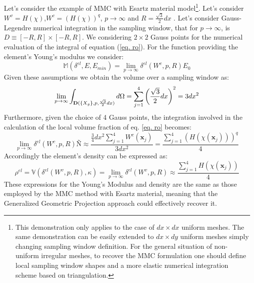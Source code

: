  Let's consider the example of MMC with Esartz material model\footnote{This demonstration only applies to the case of $dx \times dx$ uniform meshes. The same demonstration can be easily extended to $dx \times dy$ uniform meshes simply changing sampling window definition. For the general situation of non-uniform irregular meshes, to recover the MMC formulation one should define local sampling window shapes and a more elastic numerical integration scheme based on triangulation.}.
 Let's consider $W^v=H(\chi)$,$W^c=(H(\chi))^q$, $p\to\infty$ and $R=\frac{\sqrt{3}}{2}dx$ . Let's consider Gauss-Legendre numerical integration in the sampling window, that for $p\to \infty$, is $D \equiv [-R,R]\times [-R,R]$.  We considering  $2 \times 2$ Gauss points for the numerical evaluation of the integral of equation (\ref{eq. ro}). For the function providing the element's Young's modulus we consider:
 \begin{equation}
   \mathbb{M}(\delta^{el},E,E_{min})=\lim_{p\to \infty}\delta^{el}(W^c,p,R)E_0 
 \end{equation}
 Given these assumptions we obtain the volume over a sampling window as: 
 \begin{equation}
    \lim_{p\to \infty} \int_{\mathbf{D}(\left\{{X_g}\right\},p,\frac{\sqrt{3}}{2}dx)}{d\Omega}=\sum_{j=1}^4 \left(\frac{\sqrt{3}}{2}dx\right)^2=3 dx^2
 \end{equation}
 Furthermore, given the choice of 4 Gauss points, the integration involved in the calculation of the local volume fraction of eq. \ref{eq. ro} becomes:
 \begin{equation}
     \lim_{p\to \infty}\delta^{el}(W^c,p,R)Ñ
    \approx \frac{\frac{3}{4}dx^2\sum_{j=1}^4W^c(\mathbf{x}_j)}{3dx^2}=\frac{\sum_{j=1}^4(H(\chi(\mathbf{x}_j)))^q}{4}
  \end{equation}
 Accordingly the element's density can be expressed as:
 \begin{equation}
     \rho^{el}=\mathbb{V}(\delta^{el}(W^v,p,R),\kappa)=\lim_{p\to \infty}\delta^{el}(W^v,p,R)\approx\frac{\sum_{j=1}^4H(\chi(\mathbf{x}_j))}{4}
 \end{equation}
 These expressions for the Young's Modulus and density are the same as those employed by the MMC method with Esartz material, meaning that the Generalized Geometric Projection approach could effectively recover it. 
 
